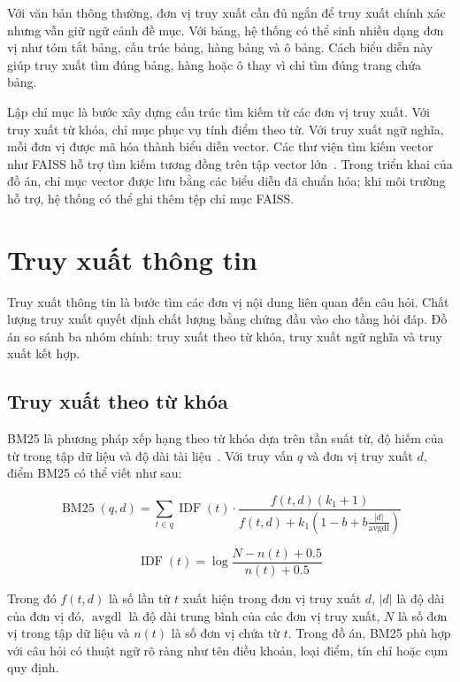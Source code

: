 \documentclass[../DoAn.tex]{subfiles}
\begin{document}
Với văn bản thông thường, đơn vị truy xuất cần đủ ngắn để truy xuất chính xác
nhưng vẫn giữ ngữ cảnh đề mục. Với bảng, hệ thống có thể sinh nhiều dạng đơn vị
như tóm tắt bảng, cấu trúc bảng, hàng bảng và ô bảng. Cách biểu diễn này giúp
truy xuất tìm đúng bảng, hàng hoặc ô thay vì chỉ tìm đúng trang chứa bảng.

Lập chỉ mục là bước xây dựng cấu trúc tìm kiếm từ các đơn vị truy xuất. Với truy xuất từ
khóa, chỉ mục phục vụ tính điểm theo từ. Với truy xuất ngữ nghĩa, mỗi đơn vị được
mã hóa thành biểu diễn vector. Các thư viện tìm kiếm vector như FAISS hỗ trợ tìm
kiếm tương đồng trên tập vector lớn~\cite{johnson2021faiss}. Trong triển khai của
đồ án, chỉ mục vector được lưu bằng các biểu diễn đã chuẩn hóa; khi môi trường
hỗ trợ, hệ thống có thể ghi thêm tệp chỉ mục FAISS.

\section{Truy xuất thông tin}
\label{section:retrieval-foundation}

Truy xuất thông tin là bước tìm các đơn vị nội dung liên quan đến câu hỏi. Chất lượng
truy xuất quyết định chất lượng bằng chứng đầu vào cho tầng hỏi đáp. Đồ án so sánh
ba nhóm chính: truy xuất theo từ khóa, truy xuất ngữ nghĩa và truy xuất kết hợp.

\subsection{Truy xuất theo từ khóa}

BM25 là phương pháp xếp hạng theo từ khóa dựa trên tần suất từ, độ hiếm của từ
trong tập dữ liệu và độ dài tài liệu~\cite{robertson2009bm25}. Với truy vấn \(q\) và
đơn vị truy xuất \(d\), điểm BM25 có thể viết như sau:

\begin{equation}
\label{eq:bm25}
\operatorname{BM25}(q,d) =
\sum_{t \in q}
\operatorname{IDF}(t)
\cdot
\frac{f(t,d)(k_1+1)}
{f(t,d)+k_1\left(1-b+b\frac{|d|}{\operatorname{avgdl}}\right)}
\end{equation}

\begin{equation}
\label{eq:idf}
\operatorname{IDF}(t)=
\log
\frac{N-n(t)+0.5}{n(t)+0.5}
\end{equation}

Trong đó \(f(t,d)\) là số lần từ \(t\) xuất hiện trong đơn vị truy xuất \(d\),
\(|d|\) là độ dài của đơn vị đó, \(\operatorname{avgdl}\) là độ dài trung bình của
các đơn vị truy xuất, \(N\) là số đơn vị trong tập dữ liệu và \(n(t)\) là số đơn vị
chứa từ \(t\). Trong đồ án, BM25 phù
hợp với câu hỏi có thuật ngữ rõ ràng như tên điều khoản, loại điểm, tín chỉ hoặc
cụm quy định.
\end{document}
